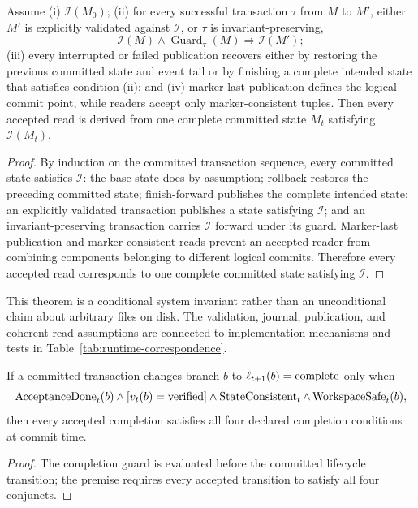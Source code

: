 \begin{theorem}
\label{thm:committed-state-soundness}
Assume (i) $\mathcal I(M_0)$; (ii) for every successful transaction $\tau$ from
$M$ to $M'$, either $M'$ is explicitly validated against $\mathcal I$, or
$\tau$ is invariant-preserving,
\begin{equation}
\mathcal I(M)\land\operatorname{Guard}_\tau(M)
\Longrightarrow
\mathcal I(M');
\label{eq:invariant-preserving-transition}
\end{equation}
(iii) every interrupted or failed publication recovers either by restoring the
previous committed state and event tail or by finishing a complete intended
state that satisfies condition (ii); and (iv) marker-last publication defines
the logical commit point, while readers accept only marker-consistent tuples.
Then every accepted read is derived from one complete committed state $M_t$
satisfying $\mathcal I(M_t)$.
\end{theorem}

\begin{proof}
By induction on the committed transaction sequence, every committed state
satisfies $\mathcal I$: the base state does by assumption; rollback restores
the preceding committed state; finish-forward publishes the complete intended
state; an explicitly validated transaction publishes a state satisfying
$\mathcal I$; and an invariant-preserving transaction carries $\mathcal I$
forward under its guard.  Marker-last publication and marker-consistent reads
prevent an accepted reader from combining components belonging to different
logical commits.  Therefore every accepted read corresponds to one complete
committed state satisfying $\mathcal I$.
\end{proof}

This theorem is a conditional system invariant rather than an unconditional
claim about arbitrary files on disk.  The validation, journal, publication, and
coherent-read assumptions are connected to implementation mechanisms and tests
in Table~\ref{tab:runtime-correspondence}.

\begin{corollary}
\label{cor:completion-soundness}
If a committed transaction changes branch $b$ to
$\ell_{t+1}(b)=\textnormal{complete}$ only when
\begin{equation}
\operatorname{AcceptanceDone}_t(b)
\land
[v_t(b)=\textnormal{verified}]
\land
\operatorname{StateConsistent}_t
\land
\operatorname{WorkspaceSafe}_t(b),
\end{equation}
then every accepted completion satisfies all four declared completion
conditions at commit time.
\end{corollary}

\begin{proof}
The completion guard is evaluated before the committed lifecycle transition;
the premise requires every accepted transition to satisfy all four conjuncts.
\end{proof}
